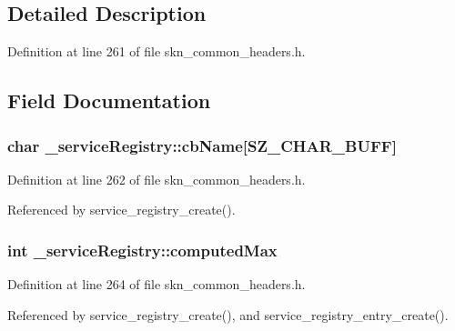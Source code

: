 \subsection{Detailed Description}


Definition at line 261 of file skn\+\_\+common\+\_\+headers.\+h.



\subsection{Field Documentation}
\subsubsection[{\texorpdfstring{cb\+Name}{cbName}}]{\setlength{\rightskip}{0pt plus 5cm}char \+\_\+service\+Registry\+::cb\+Name\mbox{[}{\bf S\+Z\+\_\+\+C\+H\+A\+R\+\_\+\+B\+U\+FF}\mbox{]}}\hypertarget{struct__service_registry_ab822dc7bf25dc0eb498e81f81581e448}{}\label{struct__service_registry_ab822dc7bf25dc0eb498e81f81581e448}


Definition at line 262 of file skn\+\_\+common\+\_\+headers.\+h.



Referenced by service\+\_\+registry\+\_\+create().

\subsubsection[{\texorpdfstring{computed\+Max}{computedMax}}]{\setlength{\rightskip}{0pt plus 5cm}int \+\_\+service\+Registry\+::computed\+Max}\hypertarget{struct__service_registry_afc84b25f775a67d768cf4915db3c7115}{}\label{struct__service_registry_afc84b25f775a67d768cf4915db3c7115}


Definition at line 264 of file skn\+\_\+common\+\_\+headers.\+h.



Referenced by service\+\_\+registry\+\_\+create(), and service\+\_\+registry\+\_\+entry\+\_\+create().

